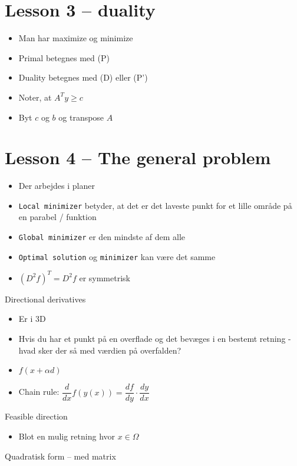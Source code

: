 \documentclass[10pt, a4]{Memoir}
\begin{document}
\newpage
\section*{Lesson 3 -- duality}

\begin{itemize}
	\item Man har maximize og minimize
	\item Primal betegnes med (P)
	\item Duality betegnes med (D) eller (P')
	\item Noter, at $A^T y \geq c$
	\item Byt $c$ og $b$ og transpose $A$
\end{itemize}






\newpage
\section*{Lesson 4 -- The general problem}

\begin{itemize}
	\item Der arbejdes i planer
	\item \texttt{Local minimizer} betyder, at det er det laveste punkt for et lille område på en parabel / funktion
	\item \texttt{Global minimizer} er den mindste af dem alle
	\item \texttt{Optimal solution} og \texttt{minimizer} kan være det samme
	\item $(D^2 f)^T = D^2 f$ er symmetrisk
\end{itemize}
Directional derivatives

\begin{itemize}
	\item Er i 3D
	\item Hvis du har et punkt på en overflade og det bevæges i en bestemt retning - hvad sker der så med værdien på overfalden?
	\item $f(x+\alpha d)$
	\item Chain rule: $\dfrac{d}{dx} f(y(x)) = \dfrac{df}{dy} \cdot \dfrac{dy}{dx}$
\end{itemize}
Feasible direction

\begin{itemize}
	\item Blot en mulig retning hvor $x \in \Omega$
\end{itemize}
Quadratisk form -- med matrix
\end{document}
